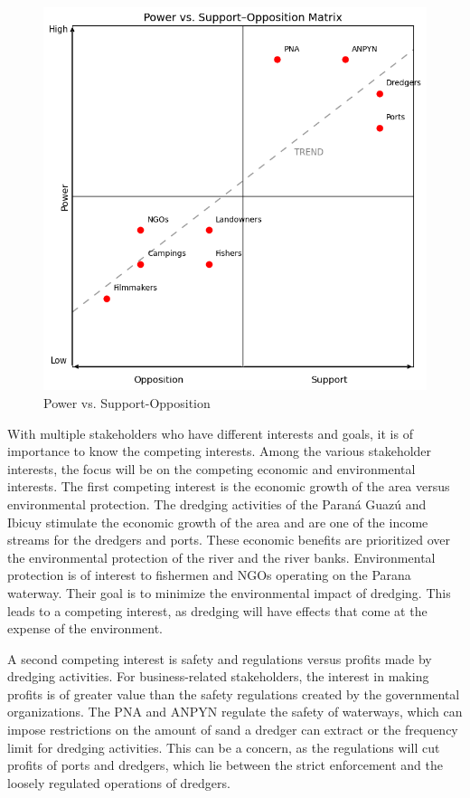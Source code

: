 \begin{figure}[H]
    \centering
    \includegraphics[width=0.70\linewidth]{figures/ch3/Support-OppositionVSPower.png}
    \caption{Power vs. Support-Opposition}
    \label{fig:support-opposition-power}
\end{figure}

With multiple stakeholders who have different interests and goals, it is of importance to know the competing interests. Among the various stakeholder interests, the focus will be on the competing economic and environmental interests. The first competing interest is the economic growth of the area versus environmental protection. The dredging activities of the Paraná Guazú and Ibicuy stimulate the economic growth of the area and are one of the income streams for the dredgers and ports. These economic benefits are prioritized over the environmental protection of the river and the river banks. Environmental protection is of interest to fishermen and NGOs operating on the Parana waterway. Their goal is to minimize the environmental impact of dredging. This leads to a competing interest, as dredging will have effects that come at the expense of the environment.

A second competing interest is  safety and regulations versus  profits made by dredging activities. For business-related stakeholders, the interest in making profits is of greater value than the safety regulations created by the governmental organizations. The PNA and ANPYN regulate the safety of waterways, which can impose restrictions on the amount of sand a dredger can extract or the frequency limit for dredging activities. This can be a concern, as the regulations will cut profits of ports and dredgers, which lie between the strict enforcement and the loosely regulated operations of dredgers.

